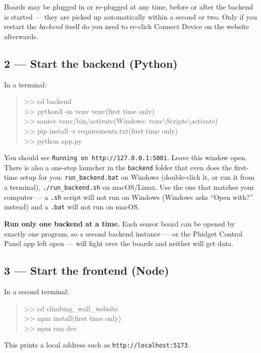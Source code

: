 \documentclass[11pt,a4paper]{article}
\begin{document}
Boards may be plugged in or re-plugged at any time, before or after the backend is
started --- they are picked up automatically within a second or two. Only if you
restart the \emph{backend} itself do you need to re-click \textsf{Connect Device}
on the website afterwards.

\subsection*{2 --- Start the backend (Python)}
In a terminal:
\begin{quote}\ttfamily
>> cd backend\\
>> python3 -m venv venv\hfill\textrm{\small(first time only)}\\
>> source venv/bin/activate\hfill\textrm{\small(Windows: venv\textbackslash Scripts\textbackslash activate)}\\
>> pip install -r requirements.txt\hfill\textrm{\small(first time only)}\\
>> python app.py
\end{quote}
You should see \texttt{Running on http://127.0.0.1:5001}. Leave this window open.
There is also a one-step launcher in the \texttt{backend} folder that even does the
first-time setup for you: \texttt{run\_backend.bat} on Windows (double-click it, or
run it from a terminal), \texttt{./run\_backend.sh} on macOS/Linux. Use the one that
matches your computer --- a \texttt{.sh} script will not run on Windows (Windows
asks ``Open with?'' instead) and a \texttt{.bat} will not run on macOS.

\begin{warnbox}
\textbf{Run only one backend at a time.} Each sensor board can be opened by exactly
one program, so a second backend instance --- or the Phidget Control Panel app left
open --- will fight over the boards and neither will get data.
\end{warnbox}

\subsection*{3 --- Start the frontend (Node)}
In a second terminal:
\begin{quote}\ttfamily
>> cd climbing\_wall\_website\\
>> npm install\hfill\textrm{\small(first time only)}\\
>> npm run dev
\end{quote}
This prints a local address such as \texttt{http://localhost:5173}.
\end{document}
